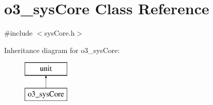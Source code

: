\hypertarget{classo3__sysCore}{
\section{o3\_\-sysCore Class Reference}
\label{classo3__sysCore}
}


{\ttfamily \#include $<$sysCore.h$>$}

Inheritance diagram for o3\_\-sysCore:\begin{figure}[H]
\begin{center}
\leavevmode
\includegraphics[height=2.000000cm]{classo3__sysCore}
\end{center}
\end{figure}
